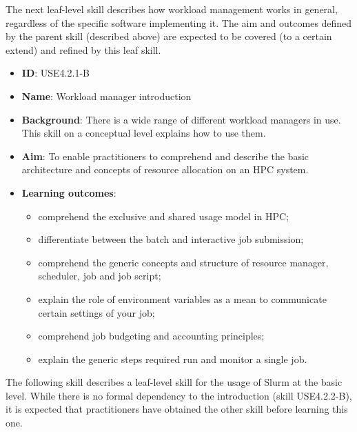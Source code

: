 \documentclass[jocse]{jocseart}
\begin{document}
The next leaf-level skill describes how workload management works in general, regardless of the specific software implementing it.
The aim and outcomes defined by the parent skill (described above) are expected to be covered (to a certain extend) and refined by this leaf skill.

\begin{itemize}
  \item \textbf{ID}: USE4.2.1-B
  \item \textbf{Name}: Workload manager introduction
  \item \textbf{Background}: There is a wide range of different workload managers in use. This skill on a conceptual level explains how to use them.
  \item \textbf{Aim}: To enable practitioners to comprehend and describe the basic architecture and concepts of resource allocation on an HPC system.
  \item \textbf{Learning outcomes}:

  \begin{itemize}
  \item comprehend the exclusive and shared usage model in HPC;
  \item differentiate between the batch and interactive job submission;
  \item comprehend the generic concepts and structure of resource manager, scheduler, job and job script;
  \item explain the role of environment variables as a mean to communicate certain settings of your job;
  \item comprehend job budgeting and accounting principles;
  \item explain the generic steps required run and monitor a single job.
  \end{itemize}
\end{itemize}


The following skill describes a leaf-level skill for the usage of Slurm at the basic level.
While there is no formal dependency to the introduction (skill USE4.2.2-B), it is expected that practitioners have obtained the other skill before learning this one.
\end{document}
